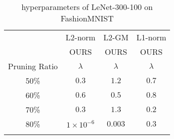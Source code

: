 \begin{table*}[h]
\centering 
\scriptsize
\begin{tabular}{c|c|c|c}\Xhline{2\arrayrulewidth}
\multirow{2}{*}{Criterion} & L2-norm& L2-GM & L1-norm\\ \cline{2-4} 
& OURS& OURS& OURS\\ \hline
Pruning Ratio& $\lambda$  & $\lambda$    & $\lambda$ \\\Xhline{2\arrayrulewidth}
50\%  & $0.3$  & $1.2$ & $0.7$  \\ \hline
60\%  & $0.6$  & $0.5$ & $0.8$  \\ \hline
70\%  & $0.3$  & $1.3$ & $0.2$   \\ \hline
80\%  & $1\times10^{-6}$  & $0.003$ & $0.3$  \\ \hline\Xhline{2\arrayrulewidth}
\end{tabular}%
\caption{hyperparameters of LeNet-300-100 on FashionMNIST}
\label{tab:param:LeNet:fashionmnist}
\vspace{4mm}



\end{table*}
